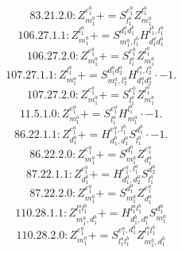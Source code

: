 \documentclass[letterpaper,10pt,fleqn,leqno,onecolumn]{article}
\begin{document}
\begin{equation} \;\;\;\;\;\;  83.21.2.0: Z^{e_{1}^{a}}_{m_{1}^{a}}+=S^{e_{1}^{a}}_{l_{1}^{a}}Z^{l_{1}^{a}}_{m_{1}^{a}} \end{equation}
\begin{equation} \;\;\;\;\;\;  106.27.1.1: Z^{l_{1}^{a}}_{m_{1}^{a}}+=S^{d_{1}^{a}d_{1}^{b}}_{m_{1}^{a},l_{1}^{b}}H^{l_{1}^{b},l_{1}^{a}}_{d_{1}^{a}d_{1}^{b}} \end{equation}
\begin{equation} \;\;\;\;\;\;  106.27.2.0: Z^{e_{1}^{a}}_{m_{1}^{a}}+=S^{e_{1}^{a}}_{l_{1}^{a}}Z^{l_{1}^{a}}_{m_{1}^{a}} \end{equation}
\begin{equation} \;\;\;\;\;\;  107.27.1.1: Z^{l_{1}^{a}}_{m_{1}^{a}}+=S^{d_{1}^{a}d_{2}^{a}}_{m_{1}^{a},l_{2}^{a}}H^{l_{1}^{a},l_{2}^{a}}_{d_{1}^{a}d_{2}^{a}}\cdot -1. \end{equation}
\begin{equation} \;\;\;\;\;\;  107.27.2.0: Z^{e_{1}^{a}}_{m_{1}^{a}}+=S^{e_{1}^{a}}_{l_{1}^{a}}Z^{l_{1}^{a}}_{m_{1}^{a}} \end{equation}
\begin{equation} \;\;\;\;\;\;  11.5.1.0: Z^{e_{1}^{a}}_{m_{1}^{a}}+=S^{e_{1}^{a}}_{l_{1}^{a}}H^{l_{1}^{a}}_{m_{1}^{a}}\cdot -1. \end{equation}
\begin{equation} \;\;\;\;\;\;  86.22.1.1: Z^{e_{1}^{a}}_{d_{1}^{a}}+=H^{e_{1}^{a},l_{1}^{b}}_{d_{1}^{b},d_{1}^{a}}S^{d_{1}^{b}}_{l_{1}^{b}}\cdot -1. \end{equation}
\begin{equation} \;\;\;\;\;\;  86.22.2.0: Z^{e_{1}^{a}}_{m_{1}^{a}}+=S^{d_{1}^{a}}_{m_{1}^{a}}Z^{e_{1}^{a}}_{d_{1}^{a}} \end{equation}
\begin{equation} \;\;\;\;\;\;  87.22.1.1: Z^{e_{1}^{a}}_{d_{1}^{a}}+=H^{e_{1}^{a},l_{1}^{a}}_{d_{1}^{a},d_{2}^{a}}S^{d_{2}^{a}}_{l_{1}^{a}} \end{equation}
\begin{equation} \;\;\;\;\;\;  87.22.2.0: Z^{e_{1}^{a}}_{m_{1}^{a}}+=S^{d_{1}^{a}}_{m_{1}^{a}}Z^{e_{1}^{a}}_{d_{1}^{a}} \end{equation}
\begin{equation} \;\;\;\;\;\;  110.28.1.1: Z^{l_{1}^{a}l_{1}^{b}}_{m_{1}^{a},d_{1}^{b}}+=H^{l_{1}^{a}l_{1}^{b}}_{d_{1}^{b},d_{1}^{a}}S^{d_{1}^{a}}_{m_{1}^{a}} \end{equation}
\begin{equation} \;\;\;\;\;\;  110.28.2.0: Z^{e_{1}^{a}}_{m_{1}^{a}}+=S^{e_{1}^{a},d_{1}^{b}}_{l_{1}^{a}l_{1}^{b}}Z^{l_{1}^{a}l_{1}^{b}}_{m_{1}^{a},d_{1}^{b}} \end{equation}
\end{document}
